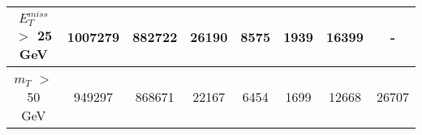\documentclass[10pt]{article}
\begin{document}
\begin{center}
\begin{table}[H]
\begin{adjustbox}{width=1\textwidth}
\begin{tabular}{cccccccc}
\multicolumn{1}{|c|}{$E_{T}^{miss}$ $>$ 25 GeV}  & \multicolumn{1}{c|}{1007279} & \multicolumn{1}{c|}{882722} & \multicolumn{1}{c|}{26190} & \multicolumn{1}{c|}{8575} & \multicolumn{1}{c|}{1939} & \multicolumn{1}{c|}{16399} & \multicolumn{1}{c|}{-}  \\ \hline 
\multicolumn{1}{|c|}{$m_{T}$ $>$ 50 GeV}  & \multicolumn{1}{c|}{949297} & \multicolumn{1}{c|}{868671} & \multicolumn{1}{c|}{22167} & \multicolumn{1}{c|}{6454} & \multicolumn{1}{c|}{1699} & \multicolumn{1}{c|}{12668} & \multicolumn{1}{c|}{26707}  \\ \hline 
\end{tabular} 										
\end{adjustbox}										
\end{table} 											
\end{center}											
\end{document}
